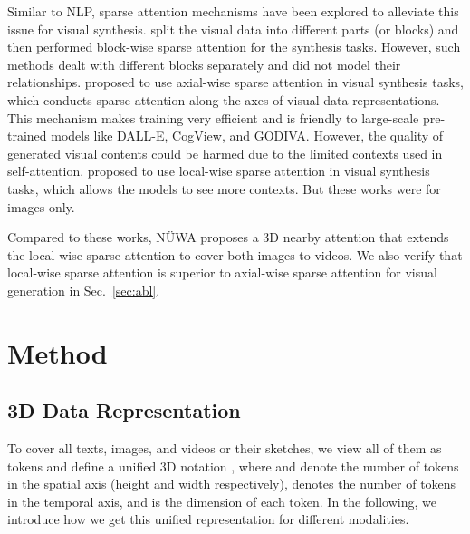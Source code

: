 \documentclass[10pt,twocolumn,letterpaper]{article}
\begin{document}
Similar to NLP, sparse attention mechanisms have been explored to alleviate this issue for visual synthesis.
\cite{weissenbornScalingAutoregressiveVideo2020, rakhimovLatentVideoTransformer2020} split the visual data into different parts (or blocks) and then performed block-wise sparse attention for the synthesis tasks. 
However, such methods dealt with different blocks separately and did not model their relationships.
\cite{hoAxialAttentionMultidimensional2019, rameshZeroShotTexttoImageGeneration2021, wuGODIVAGeneratingOpenDomaIn2021} proposed to use axial-wise sparse attention in visual synthesis tasks, which conducts sparse attention along the axes of visual data representations. This mechanism makes training very efficient and is friendly to large-scale pre-trained models like DALL-E\cite{rameshZeroShotTexttoImageGeneration2021}, CogView\cite{dingCogViewMasteringTexttoImage2021}, and GODIVA\cite{wuGODIVAGeneratingOpenDomaIn2021}. However, the quality of generated visual contents could be harmed due to the limited contexts used in self-attention.
\cite{parmarImageTransformer2018, ramachandranStandaloneSelfattentionVision2019, childGeneratingLongSequences2019} proposed to use local-wise sparse attention in visual synthesis tasks, which allows the models to see more contexts. But these works were for images only.

Compared to these works, NÜWA proposes a 3D nearby attention that extends the local-wise sparse attention to cover both images to videos. We also verify that local-wise sparse attention is superior to axial-wise sparse attention for visual generation in Sec.~\ref{sec:abl}.

 








\section{Method}
\subsection{3D Data Representation} \label{sec:rep}
To cover all texts, images, and videos or their sketches, we view all of them as tokens and define a unified 3D notation , where  and  denote the number of tokens in the spatial axis (height and width respectively),  denotes the number of tokens in the temporal axis, and  is the dimension of each token. In the following, we introduce how we get this unified representation for different modalities.
\end{document}
